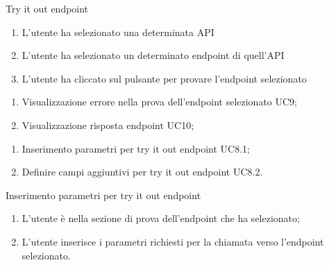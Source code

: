 \begin{usecase}{8}{Try it out endpoint}\label{uc:try-it-out-endpoint}

    \usecasemain{}
        \begin{enumerate}
            \item L'utente ha selezionato una determinata API
            \item L'utente ha selezionato un determinato endpoint di quell'API
            \item L'utente ha cliccato sul pulsante per provare l'endpoint selezionato
        \end{enumerate}

    \usecaseext{}
        \begin{enumerate}
            \item Visualizzazione errore nella prova dell'endpoint selezionato UC9;
            \item Visualizzazione risposta endpoint UC10;
        \end{enumerate}

    \usecasegen{}
        \begin{enumerate}
            \item Inserimento parametri per try it out endpoint UC8.1;
            \item Definire campi aggiuntivi per try it out endpoint UC8.2.
        \end{enumerate}

\end{usecase}


\begin{usecase}{8.1}{Inserimento parametri per try it out endpoint}\label{uc:inserimento-parametri-try-it-out-endpoint}

    \usecasemain{}
        \begin{enumerate}
            \item L'utente è nella sezione di prova dell'endpoint che ha selezionato;
            \item L'utente inserisce i parametri richiesti per la chiamata verso l'endpoint selezionato.
        \end{enumerate}

\end{usecase}


